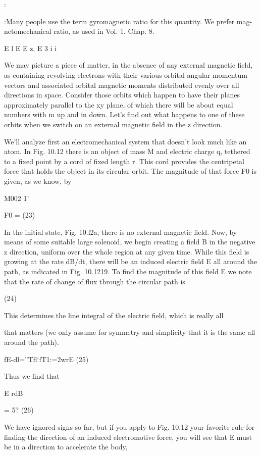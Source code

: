 {{:{:Many people use the term gyromagnetic ratio for this quantity. We prefer mag-
netomechanical ratio, as used in Vol. 1, Chap. 8.

E
l
E
E
z,
E
3
i
i

We may picture a piece of matter, in the absence of any external
magnetic field, as containing revolving electrons with their various
orbital angular momentum vectors and associated orbital magnetic
moments distributed evenly over all directions in space. Consider
those orbits which happen to have their planes approximately parallel
to the xy plane, of which there will be about equal numbers with
m up and in down. Let's find out what happens to one of these orbits
when we switch on an external magnetic field in the z direction.

We'll analyze first an electromechanical system that doesn't look
much like an atom. In Fig. 10.12 there is an object of mass M and
electric charge q, tethered to a fixed point by a cord of fixed length r.
This cord provides the centripetal force that holds the object in its
circular orbit. The magnitude of that force F0 is given, as we
know, by

M002
1'

F0 = (23)

In the initial state, Fig. 10.l2a, there is no external magnetic field.
Now, by means of some suitable large solenoid, we begin creating
a field B in the negative z direction, uniform over the whole region
at any given time. While this field is growing at the rate dB/dt, there
will be an induced electric field E all around the path, as indicated in
Fig. 10.1219. To find the magnitude of this field E we note that the
rate of change of flux through the circular path is

(24)

This determines the line integral of the electric field, which is really all

that matters (we only assume for symmetry and simplicity that it
is the same all around the path).

fE-dl=''Tfl‘fT1:=2wrE (25)

Thus we find that

E rdB

= 5? (26)

We have ignored signs so far, but if you apply to Fig. 10.12 your
favorite rule for finding the direction of an induced electromotive
force, you will see that E must be in a direction to accelerate the body,

}}}
